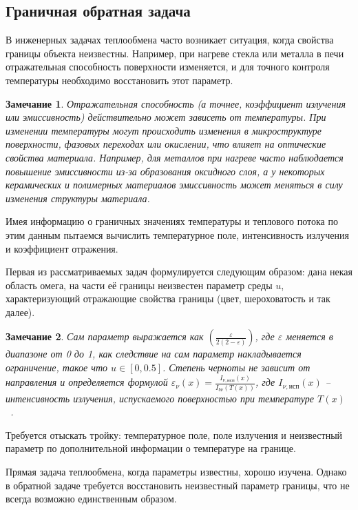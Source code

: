 \documentclass[8pt,a4paper]{article}
\newtheorem*{remark}{Замечание}
\begin{document}
    \subsection*{Граничная обратная задача}
    В инженерных задачах теплообмена часто возникает ситуация, когда свойства границы объекта неизвестны.
    Например, при нагреве стекла или металла в печи отражательная способность поверхности изменяется,
    и для точного контроля температуры необходимо восстановить этот параметр.
    \begin{remark}
        Отражательная способность (а точнее, коэффициент излучения или эмиссивность) действительно может зависеть от температуры.
        При изменении температуры могут происходить изменения в микроструктуре поверхности,
        фазовых переходах или окислении, что влияет на оптические свойства материала.
        Например, для металлов при нагреве часто наблюдается повышение эмиссивности
        из-за образования оксидного слоя, а у некоторых керамических и полимерных материалов эмиссивность
        может меняться в силу изменения структуры материала.
    \end{remark}

    Имея информацию о граничных значениях температуры и теплового потока
    по этим данным пытаемся вычислить температурное поле, интенсивность излучения и коэффициент отражения.


    Первая из рассматриваемых задач формулируется следующим образом:
    дана некая область омега,
    на части её границы неизвестен параметр среды $u$, характеризующий отражающие свойства границы
    (цвет, шероховатость и так далее).
    \begin{remark}
        Сам параметр выражается как $(\frac{\varepsilon}{2(2-\varepsilon)})$,
        где $\varepsilon$ меняется в диапазоне от 0 до 1,
        как следствие на сам параметр накладывается ограничение, такое что $u \in [0, 0.5]$.
        Степень черноты не зависит от направления и определяется формулой
        $\varepsilon_\nu(x) = \frac{I_{\nu,\text{исп}}(x)}{I_{b\nu}(T(x))}$, где
        $I_{\nu,\text{исп}}(x)$ -- интенсивность излучения, испускаемого
        поверхностью при температуре $T(x)$~\cite[53]{Ozisik1976}.

    \end{remark}

    Требуется отыскать тройку: температурное поле,
    поле излучения и неизвестный параметр
    по дополнительной информации о температуре на границе.

    Прямая задача теплообмена, когда параметры известны, хорошо изучена.
    Однако в обратной задаче требуется восстановить неизвестный параметр границы,
    что не всегда возможно единственным образом.
\end{document}
